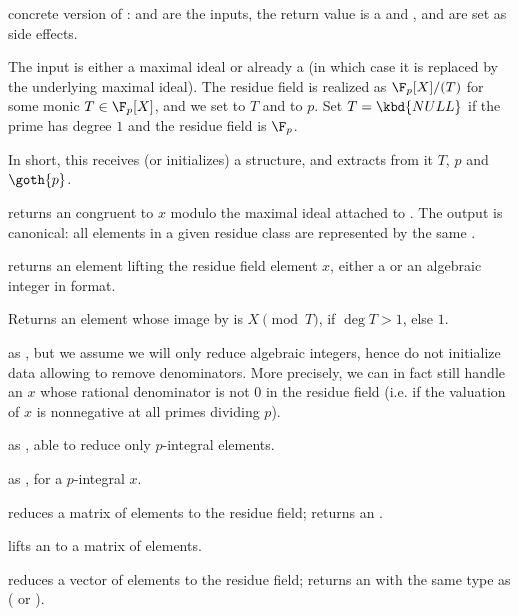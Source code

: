  concrete
version of :  and  are the inputs, the
return value is a  and ,  and  are set
as side effects.

The input  is either a maximal ideal or already a  (in
which case it is replaced by the underlying maximal ideal). The residue field
is realized as $\F_p[X]/(T)$ for some monic $T\in\F_p[X]$, and we set
 to $T$ and  to $p$. Set $T = \kbd{NULL}$ if the prime has
degree $1$ and the residue field is $\F_p$.

In short, this receives (or initializes) a  structure, and
extracts from it $T$, $p$ and $\goth{p}$.

 returns an  congruent
to $x$ modulo the maximal ideal attached to . The output is
canonical: all elements in a given residue class are represented by the same
.

 returns an  element lifting
the residue field element $x$, either a  or an algebraic integer
in  format.

 Returns an  element whose image by
 is $X \pmod T$, if $\deg T>1$, else $1$.

 as , but we assume we
will only reduce algebraic integers, hence do not initialize data allowing to
remove denominators. More precisely, we can in fact still handle an $x$ whose
rational denominator is not $0$ in the residue field (i.e. if the valuation
of $x$ is nonnegative at all primes dividing $p$).

 as
, able to reduce only $p$-integral elements.

 as , for
a $p$-integral $x$.

 reduces a matrix
of  elements to the residue field; returns an .

 lifts an  to a matrix of
 elements.

 reduces a vector
of  elements to the residue field; returns an 
with the same type as  ( or ).

